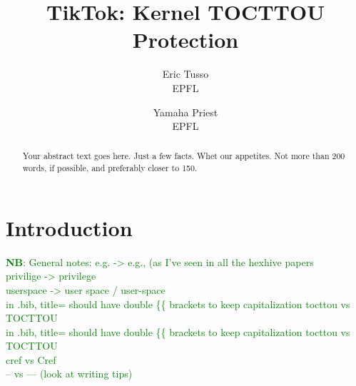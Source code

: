 \usepackage{listings}
\usepackage{parcolumns}
\usepackage{graphicx}
\usepackage{caption}
\usepackage{subcaption}
\usepackage{cleveref}

\newcommand{\pra}[1]{\textcolor{blue}{\textbf{PS:} #1}}
\newcommand{\nb}[1]{\textcolor{green}{\textbf{NB}: #1}}
\newcommand{\mat}[1]{\textcolor{red}{\textbf{Mat:} #1}}


\date{}

\title{\Large \bf TikTok: Kernel TOCTTOU Protection}

\author{
{\rm Eric Tusso}\\
EPFL
\and
{\rm Yamaha Priest}\\
EPFL
} %

\maketitle

\begin{abstract}
Your abstract text goes here. Just a few facts. Whet our appetites.
Not more than 200 words, if possible, and preferably closer to 150.
\end{abstract}
\section{Introduction}
\nb{General notes: e.g. -> e.g., (as I've seen in all the hexhive papers\\
privilige -> privilege\\
userspace -> user space / user-space\\
in .bib, title= should have double \{\{ brackets to keep capitalization tocttou
  vs TOCTTOU\\
in .bib, title= should have double \{\{ brackets to keep capitalization tocttou
  vs TOCTTOU\\
cref vs Cref\\
-- vs --- (look at writing tips)}

